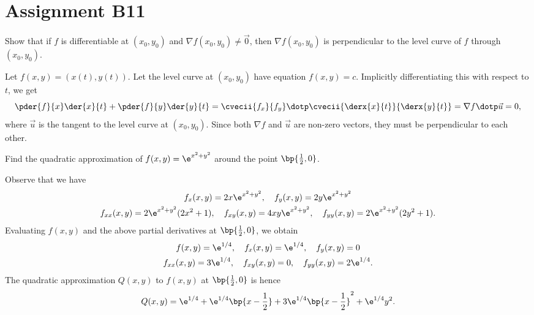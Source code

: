 \section{Assignment B11}\label{S::Assignment-B11}

\begin{problem}
    Show that if $f$ is differentiable at $(x_0, y_0)$ and $\nabla f(x_0, y_0) \neq \vec 0$, then $\nabla f(x_0, y_0)$ is perpendicular to the level curve of $f$ through $(x_0, y_0)$.
\end{problem}
\begin{solution}
    Let $f(x, y) = (x(t), y(t))$. Let the level curve at $(x_0, y_0)$ have equation $f(x, y) = c$. Implicitly differentiating this with respect to $t$, we get \[\pder{f}{x} \der{x}{t} + \pder{f}{y} \der{y}{t} = \cvecii{f_x}{f_y} \dotp \cvecii{\derx{x}{t}}{\derx{y}{t}} = \nabla f \dotp \vec u = 0,\] where $\vec u$ is the tangent to the level curve at $(x_0, y_0)$. Since both $\nabla f$ and $\vec u$ are non-zero vectors, they must be perpendicular to each other.
\end{solution}

\begin{problem}
    Find the quadratic approximation of $f(x, y) = \e^{x^2 + y^2}$ around the point $\bp{\frac12, 0}$.
\end{problem}
\begin{solution}
    Observe that we have
    \begin{gather*}
        f_x(x, y) = 2x\e^{x^2 + y^2}, \quad f_y(x, y) = 2y\e^{x^2 + y^2}\\
        f_{xx}(x, y) = 2\e^{x^2 + y^2}(2x^2 + 1), \quad f_{xy}(x, y) = 4xy\e^{x^2 + y^2}, \quad f_{yy}(x, y) = 2\e^{x^2 + y^2}(2y^2 + 1).
    \end{gather*}
    Evaluating $f(x, y)$ and the above partial derivatives at $\bp{\frac12, 0}$, we obtain
    \begin{gather*}
        f(x, y) = \e^{1/4}, \quad f_x(x, y) = \e^{1/4}, \quad f_y(x, y) = 0\\
        f_{xx}(x, y) = 3\e^{1/4}, \quad f_{xy}(x, y) = 0, \quad f_{yy}(x, y) = 2\e^{1/4}.
    \end{gather*}
    The quadratic approximation $Q(x, y)$ to $f(x, y)$ at $\bp{\frac12, 0}$ is hence \[Q(x, y) = \e^{1/4} + \e^{1/4}\bp{x - \frac12} + 3\e^{1/4} \bp{x - \frac12}^2 + \e^{1/4} y^2.\]
\end{solution}

